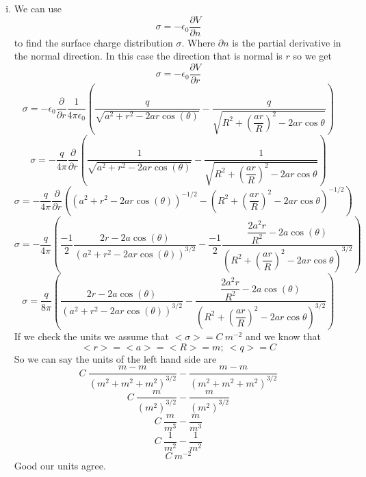 \documentclass[11pt]{article}
\numberwithin{equation}{section}
\begin{document}
\begin{enumerate}[(i)]
\item
We can use
$$\sigma= -\epsilon_0\frac{\partial V}{\partial n}$$ 
to find the surface charge distribution $\sigma$. Where $\partial n$ is the partial derivative in the normal direction. In this case the direction that is normal is $r$ so we get 
$$\sigma= -\epsilon_0\frac{\partial V}{\partial r}$$ 
$$\sigma= -\epsilon_0\frac{\partial}{\partial r}\frac{1}{4\pi\epsilon_0}\left(\frac{q}{\sqrt{a^2+r^2-2ar\cos(\theta)}}-\frac{q}{\sqrt{R^2+\left(\dfrac{ar}{R}\right)^2-2ar\cos{\theta}}}\right)$$
$$\sigma= -\frac{q}{4\pi}\frac{\partial}{\partial r}\left(\frac{1}{\sqrt{a^2+r^2-2ar\cos(\theta)}}-\frac{1}{\sqrt{R^2+\left(\dfrac{ar}{R}\right)^2-2ar\cos{\theta}}}\right)$$
$$\sigma= -\frac{q}{4\pi}\frac{\partial}{\partial r}\left(\left({a^2+r^2-2ar\cos(\theta)}\right)^{-1/2}-\left(R^2+\left(\dfrac{ar}{R}\right)^2-2ar\cos{\theta}\right)^{-1/2}\right)$$
$$\sigma= -\frac{q}{4\pi}\left(\frac{-1}{2}\dfrac{2r-2a\cos(\theta)}{\left(a^2+r^2-2ar\cos(\theta)\right)^{3/2}}-\frac{-1}{2}\dfrac{\dfrac{2a^2r}{R^2} - 2a\cos(\theta)}{\left(R^2+\left(\dfrac{ar}{R}\right)^2-2ar\cos{\theta}\right)^{3/2}}\right)$$
$$\sigma= \frac{q}{8\pi}\left(\dfrac{2r-2a\cos(\theta)}{\left(a^2+r^2-2ar\cos(\theta)\right)^{3/2}}-\dfrac{\dfrac{2a^2r}{R^2} - 2a\cos(\theta)}{\left(R^2+\left(\dfrac{ar}{R}\right)^2-2ar\cos{\theta}\right)^{3/2}}\right)$$
If we check the units we assume that $<\sigma> = C\ m^{-2}$ and we know that 
$$<r>=<a>=<R>=m;\ <q>=C$$
So we can say the units of the left hand side are
$$C\ \frac{m-m}{(m^2+m^2+m^2)^{3/2}}-\frac{m-m}{(m^2+m^2+m^2)^{3/2}}$$
$$C\ \frac{m}{(m^2)^{3/2}}-\frac{m}{(m^2)^{3/2}}$$
$$C\ \frac{m}{m^3}-\frac{m}{m^3}$$
$$C\ \frac{1}{m^2}-\frac{1}{m^2}$$
$$C\ m^{-2}$$
Good our units agree.
\end{enumerate}
\end{document}
